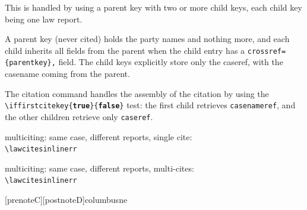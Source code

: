 This is handled by using a parent key with two or more child keys, each child key being one law report.

A parent key (never cited) holds the party names and nothing more, and each child inherits all fields from the parent when the child entry has a \texttt{crossref=\{parentkey\},} field. The child keys explicitly store only the caseref, with the casename coming from the parent.

The citation command handles the assembly of the citation by using the \texttt{\textbackslash iffirstcitekey\{\textbf{true}\}\{\textbf{false}\}} test: the first child retrieves \texttt{casenameref}, and the other children retrieve only \texttt{caseref}.
\bigskip

\noindent
\theball
multiciting: same case, different reports, single cite: \\
\verb|\lawcitesinlinerr|
\bigskip

\begin{filecontents}{\democodefile}
\end{filecontents}
\PrintCodeAndResultsStackedR

\spotsep

\noindent
\theball
multiciting: same case, different reports, multi-cites:  \\
\verb|\lawcitesinlinerr|
\bigskip

\begin{filecontents}{\democodefile}
[prenoteC][postnoteD]{columbusne}
\end{filecontents}
\PrintCodeAndResultsStackedR
\spotsep

